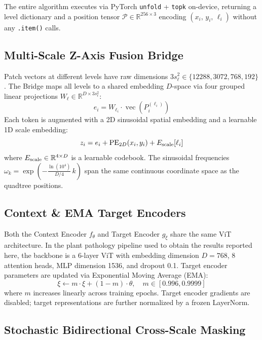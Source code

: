 \documentclass[10pt,twocolumn,letterpaper]{article}
\begin{document}
The entire algorithm executes via PyTorch \texttt{unfold} + \texttt{topk} on-device, returning a level dictionary and a position tensor $\mathcal{P} \in \mathbb{R}^{256 \times 3}$ encoding $(x_i,\, y_i,\, \ell_i)$ without any \texttt{.item()} calls.

\subsection{Multi-Scale Z-Axis Fusion Bridge}
\label{sec:bridge}

Patch vectors at different levels have raw dimensions $3s_\ell^2 \in \{12288, 3072, 768, 192\}$. The Bridge maps all levels to a shared embedding $D$-space via four grouped linear projections $W_\ell \in \mathbb{R}^{D \times 3s_\ell^2}$:
\begin{equation}
e_i = W_{\ell_i} \cdot \operatorname{vec}(P_i^{(\ell_i)})
\end{equation}
Each token is augmented with a 2D sinusoidal spatial embedding and a learnable 1D scale embedding:
\begin{equation}
z_i = e_i + \operatorname{PE}_{2D}(x_i, y_i) + E_{\rm scale}[\ell_i]
\end{equation}
where $E_{\rm scale} \in \mathbb{R}^{4 \times D}$ is a learnable codebook. The sinusoidal frequencies $\omega_k = \exp\!\left(-\frac{\ln(10^4)}{D/4}\,k\right)$ span the same continuous coordinate space as the quadtree positions.

\subsection{Context \& EMA Target Encoders}
\label{sec:encoders}

Both the Context Encoder $f_\theta$ and Target Encoder $g_\xi$ share the same ViT architecture. In the plant pathology pipeline used to obtain the results reported here, the backbone is a 6-layer ViT with embedding dimension $D=768$, 8 attention heads, MLP dimension 1536, and dropout 0.1. Target encoder parameters are updated via Exponential Moving Average (EMA):
\begin{equation}
\xi \leftarrow m \cdot \xi + (1 - m) \cdot \theta, \quad m \in [0.996, 0.9999]
\end{equation}
where $m$ increases linearly across training epochs. Target encoder gradients are disabled; target representations are further normalized by a frozen LayerNorm.

\subsection{Stochastic Bidirectional Cross-Scale Masking}
\label{sec:masking}
\end{document}
